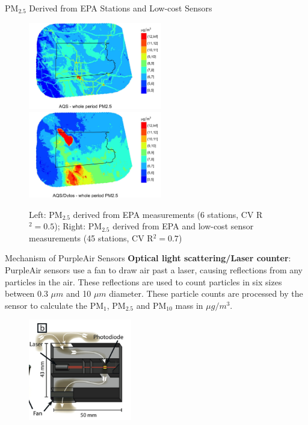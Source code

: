 \documentclass{beamer}
\begin{document}
\begin{frame}{PM$_{2.5}$ Derived from EPA Stations and Low-cost Sensors}
    \begin{figure}
        \centering
        \includegraphics[width=0.52\textwidth]{img/appendix/Aim2/aqs.jpg}
        \includegraphics[width=0.52\textwidth]{img/appendix/Aim2/aqs_dylos.jpg}
        \caption{Left: PM$_{2.5}$ derived from EPA measurements (6 stations, CV R$^2 = 0.5$); Right: PM$_{2.5}$ derived from EPA and low-cost sensor measurements (45 stations, CV R$^2 = 0.7$)}
    \end{figure}
\end{frame}

\begin{frame}{Mechanism of PurpleAir Sensors}
    \textbf{Optical light scattering/Laser counter}: PurpleAir sensors use a fan to draw air past a laser, causing reflections from any particles in the air. These reflections are used to count particles in six sizes between 0.3 $\mu m$ and 10 $\mu m$ diameter. These particle counts are processed by the sensor to calculate the PM$_1$, PM$_{2.5}$ and PM$_{10}$ mass in $\mu g/m^3$.
    \begin{figure}
        \centering
        \includegraphics[width=0.4\textwidth]{img/appendix/Aim2/sensor.png}
    \end{figure}
\end{frame}
\end{document}
